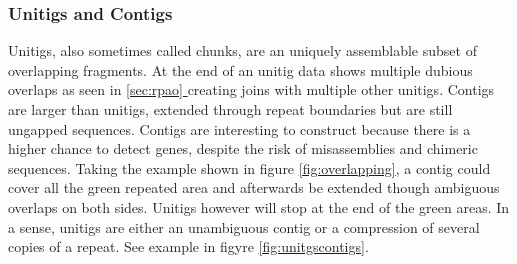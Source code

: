 \documentclass[10pt, twocolumn]{article}
\newcommand*{\fulleref}[1]{\hyperref[{#1}]{\autoref*{#1} \nameref*{#1}}}
\begin{document}
\subsubsection{Unitigs and Contigs}
Unitigs, also sometimes called chunks, are an uniquely assemblable subset of overlapping fragments. At the end of an unitig data shows multiple dubious overlaps as seen in \fulleref{sec:rpao} creating joins with multiple other unitigs. Contigs are larger than unitigs, extended through repeat boundaries but are still ungapped sequences. Contigs are interesting to construct because there is a higher chance to detect genes, despite the risk of misassemblies and chimeric sequences. 
Taking the example shown in figure \ref{fig:overlapping}, a contig could cover all the green repeated area and afterwards be extended though ambiguous overlaps on both sides. Unitigs however will stop at the end of the green areas. In a sense, unitigs are either an unambiguous contig or a compression of several copies of a repeat. See example in figyre \ref{fig:unitgscontigs}.
\end{document}
